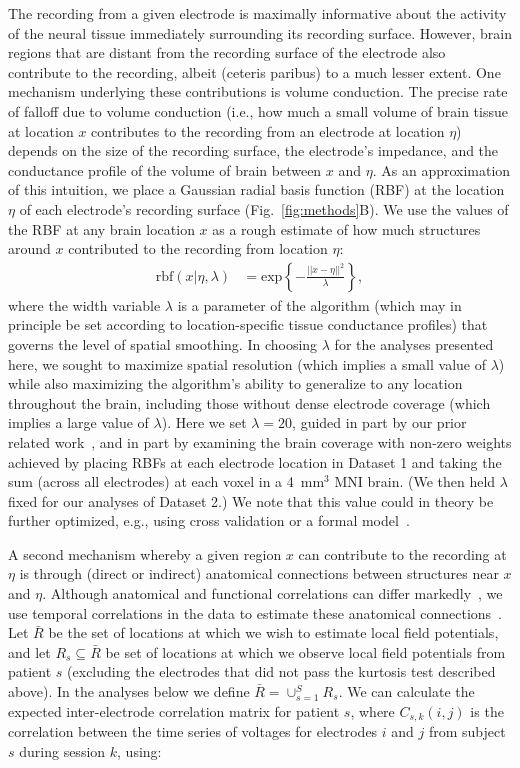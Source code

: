 \documentclass[11pt]{article}
\begin{document}
The recording from a given electrode is maximally informative about
the activity of the neural tissue immediately surrounding its
recording surface.  However, brain regions that are distant from the
recording surface of the electrode also contribute to the recording,
albeit (ceteris paribus) to a much lesser extent.  One mechanism
underlying these contributions is volume conduction.  The precise rate
of falloff due to volume conduction (i.e., how much a small volume of
brain tissue at location $x$ contributes to the recording from an
electrode at location $\eta$) depends on the size of the recording
surface, the electrode's impedance, and the conductance profile of the
volume of brain between $x$ and $\eta$.  As an approximation of this
intuition, we place a Gaussian radial basis function (RBF) at the
location $\eta$ of each electrode's recording surface
(Fig.~\ref{fig:methods}B).  We use the values of the RBF at any brain
location $x$ as a rough estimate of how much structures around $x$
contributed to the recording from location $\eta$:
\begin{align}
  \mathrm{rbf}(x|\eta,\lambda) & =
  \mathrm{exp}\left\{ -\frac{||x - \eta||^2}{\lambda} \right\},\label{eqn:rbf}
\end{align}
where the width variable $\lambda$ is a parameter of the algorithm
(which may in principle be set according to location-specific tissue
conductance profiles) that governs the level of spatial smoothing.  In
choosing $\lambda$ for the analyses presented here, we sought to
maximize spatial resolution (which implies a small value of $\lambda$)
while also maximizing the algorithm's ability to generalize to any
location throughout the brain, including those without dense electrode
coverage (which implies a large value of $\lambda$).  Here we set
$\lambda = 20$, guided in part by our prior related work~\citep{MannEtal14b,
  MannEtal18}, and in part by examining the brain coverage with
non-zero weights achieved by placing RBFs at each electrode location
in Dataset 1 and taking the sum (across all electrodes) at each voxel
in a 4~mm$^3$ MNI brain.  (We then held $\lambda$ fixed for our
analyses of Dataset 2.)  We note that this value could in theory be
further optimized, e.g., using cross validation or a formal
model~\citep[e.g.,][]{MannEtal18}.

A second mechanism whereby a given region $x$ can contribute to the
recording at $\eta$ is through (direct or indirect) anatomical
connections between structures near $x$ and $\eta$.  Although
anatomical and functional correlations can differ
markedly~\citep[e.g.,][]{AdacEtal12, HoneEtal09, GoniEtal14}, we use temporal
correlations in the data to estimate these anatomical
connections~\citep{BeckEtal18}.  Let $\bar{R}$ be the set of locations
at which we wish to estimate local field potentials, and let
$R_{s} \subseteq \bar{R}$ be set of locations at which we observe local
field potentials from patient $s$ (excluding the electrodes that did
not pass the kurtosis test described above). In the analyses below we
define $\bar{R} = \cup_{s=1}^S R_s$.  We can calculate the expected
inter-electrode correlation matrix for patient $s$, where
$C_{s,k}(i,j)$ is the correlation between the time series of voltages
for electrodes $i$ and $j$ from subject $s$ during session $k$, using:
\end{document}
